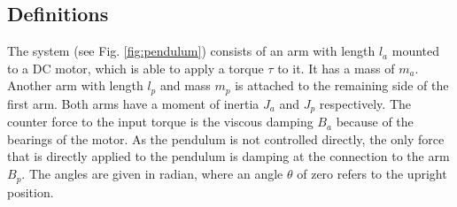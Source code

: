 \subsection{Definitions}
The system (see Fig. \ref{fig:pendulum}) consists of an arm with length $l_a$ 
mounted to a DC motor, which is 
able to apply a torque $\tau$ to it. It has a mass of $m_a$. Another arm with 
length $l_p$ and mass 
$m_p$
is attached to the remaining side of the 
first arm. Both arms have a moment of inertia $J_a$ and $J_p$ respectively. The 
counter force to the input torque is the viscous damping $B_a$ because of the 
bearings of the motor. As the pendulum is not controlled directly, the only 
force that is directly applied to the pendulum is damping at the connection to 
the arm $B_p$. The angles are given in radian, where an angle $\theta$ of zero 
refers to the upright position.

